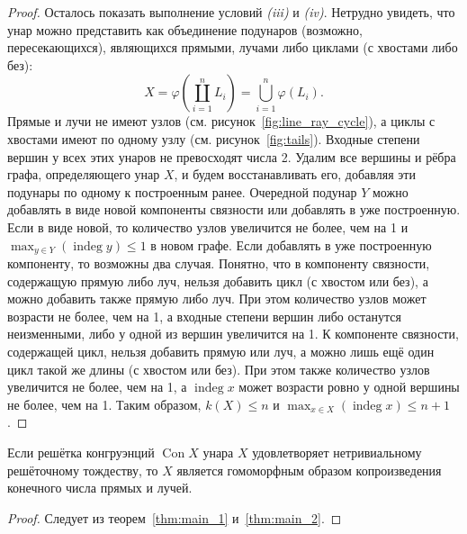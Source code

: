 \documentclass[11pt,twoside,final
]{article}
\def\Con{\operatorname{Con}}
\def\indeg{\operatorname{indeg}}
\begin{document}
\begin{proof}
	Осталось показать выполнение условий \textit{(iii)} и \textit{(iv)}.
	Нетрудно увидеть, что унар можно представить как объединение подунаров (возможно, пересекающихся), являющихся прямыми, лучами либо циклами (с хвостами либо без):
	\[
		X = \varphi(\coprod_{i = 1}^n L_i) = \bigcup_{i = 1}^n \varphi(L_i).
	\]
	Прямые и лучи не имеют узлов (см. рисунок~\ref{fig:line_ray_cycle}), а циклы с хвостами имеют по одному узлу (см. рисунок~\ref{fig:tails}).
	Входные степени вершин у всех этих унаров не превосходят числа 2.
	Удалим все вершины и рёбра графа, определяющего унар $X$, и будем восстанавливать его, добавляя эти подунары по одному к построенным ранее.
	Очередной подунар $Y$ можно добавлять в виде новой компоненты связности или добавлять в уже построенную.
	Если в виде новой, то количество узлов увеличится не более, чем на 1 и $\max_{y \in Y} (\indeg y) \leqslant 1$ в новом графе.
	Если добавлять в уже построенную компоненту, то возможны два случая.
	Понятно, что в компоненту связности, содержащую прямую либо луч, нельзя добавить цикл (с хвостом или без), а можно добавить также прямую либо луч.
	При этом количество узлов может возрасти не более, чем на 1, а входные степени вершин либо останутся неизменными, либо у одной из вершин увеличится на 1.
	К компоненте связности, содержащей цикл, нельзя добавить прямую или луч, а можно лишь ещё один цикл такой же длины (с хвостом или без).
	При этом также количество узлов увеличится не более, чем на 1, а $\indeg x$ может возрасти ровно у одной вершины не более, чем на 1.
	Таким образом, $k(X) \leqslant n$ и $\max_{x \in X} (\indeg x) \leqslant  n + 1$.
\end{proof}

\begin{corollary}
	Если решётка конгруэнций $\Con X$ унара $X$ удовлетворяет нетривиальному решёточному тождеству, то $X$ является гомоморфным образом копроизведения конечного числа прямых и лучей.
\end{corollary}
\begin{proof}
	Следует из теорем~\ref{thm:main_1} и~\ref{thm:main_2}.
\end{proof}
\end{document}
